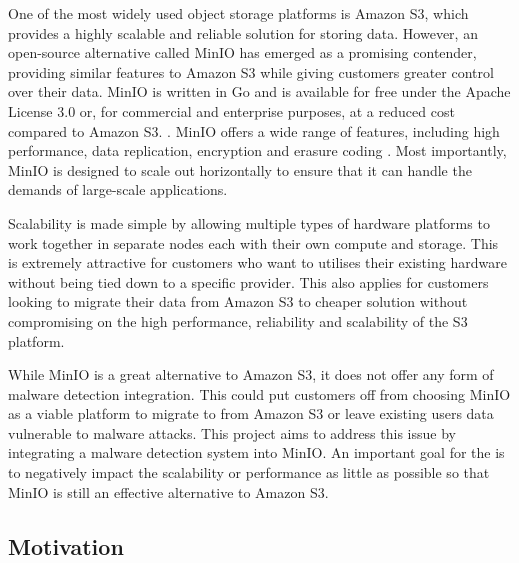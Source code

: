 \documentclass[12pt, conference, final, a4paper, onecolumn, compsoc]{IEEEtran}
\begin{document}

One of the most widely used object storage platforms is Amazon S3, which
provides a highly scalable and reliable solution for storing data. However, an
open-source alternative called MinIO has emerged as a promising contender,
providing similar features to Amazon S3 while giving customers greater control
over their data. MinIO is written in Go and is available for free under the
Apache License 3.0 or, for commercial and enterprise purposes, at a reduced cost
compared to Amazon S3. \citep{minio-pricing}. MinIO offers a wide range of
features, including high performance, data replication, encryption and erasure
coding \citep{minio}. Most importantly, MinIO is designed to scale out
horizontally to ensure that it can handle the demands of large-scale
applications.

Scalability is made simple by allowing multiple types of hardware platforms to
work together in separate nodes each with their own compute and storage. This is
extremely attractive for customers who want to utilises their existing hardware
without being tied down to a specific provider. This also applies for customers
looking to migrate their data from Amazon S3 to cheaper solution without
compromising on the high performance, reliability and scalability of the S3
platform.

While MinIO is a great alternative to Amazon S3, it does not offer any form of
malware detection integration. This could put customers off from choosing MinIO
as a viable platform to migrate to from Amazon S3 or leave existing users data
vulnerable to malware attacks. This project aims to address this issue by
integrating a malware detection system into MinIO. An important goal for the is
to negatively impact the scalability or performance as little as possible so
that MinIO is still an effective alternative to Amazon S3.

\subsection*{Motivation} %
\end{document}
